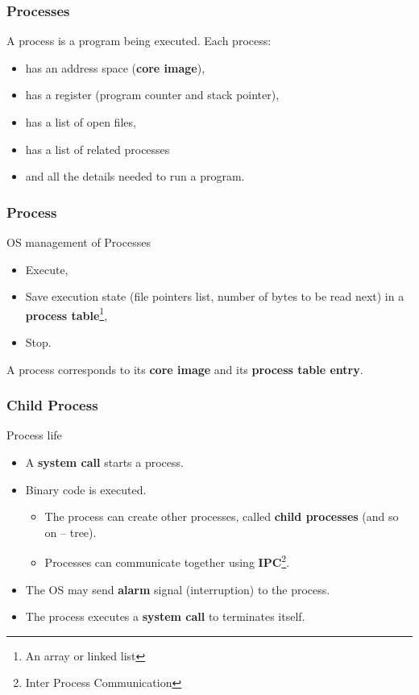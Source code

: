   \begin{frame}
    \frametitle{Processes}
    A process is a program being executed. Each process:
    \begin{itemize}
      \item has an address space (\textbf{core image}),
      \item has a register (program counter and stack pointer),
      \item has a list of open files,
      \item has a list of related processes
      \item and all the details needed to run a program.
    \end{itemize}
  \end{frame}
  \begin{frame}
    \frametitle{Process}
      \begin{block}{OS management of Processes}
        \begin{itemize}
          \item Execute,
          \item Save execution state (file pointers list, number of bytes to be read next) in a \textbf{process table}\footnote{An array or linked list},
          \item Stop.
        \end{itemize}
      \end{block}
    A process corresponds to its \textbf{core image} and its \textbf{process table entry}.
  \end{frame}
  \begin{frame}
    \frametitle{Child Process}
      \begin{block}{Process life}
        \begin{itemize}
          \item A \textbf{system call} starts a process.
          \item Binary code is executed.
            \begin{itemize}
              \item The process can create other processes, called \textbf{child processes} (and so on -- tree).
              \item Processes can communicate together using \textbf{IPC}\footnote{Inter Process Communication}.
            \end{itemize}
          \item The OS may send \textbf{alarm} signal (interruption) to the process.
          \item The process executes a \textbf{system call} to terminates itself.
        \end{itemize}
      \end{block}
  \end{frame}
